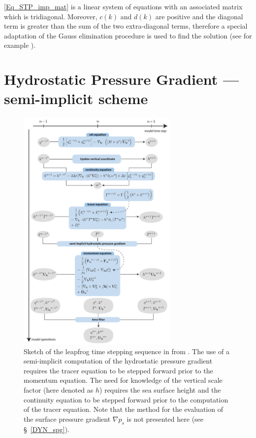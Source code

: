\eqref{Eq_STP_imp_mat} is a linear system of equations with an associated 
matrix which is tridiagonal. Moreover, $c(k)$ and $d(k)$ are positive and the diagonal 
term is greater than the sum of the two extra-diagonal terms, therefore a special 
adaptation of the Gauss elimination procedure is used to find the solution 
(see for example \citet{Richtmyer1967}).



\section{Hydrostatic Pressure Gradient --- semi-implicit scheme}
\label{STP_hpg_imp}

\begin{figure}[!t] 	  \begin{center}
\includegraphics[width=0.7\textwidth]{./TexFiles/Figures/Fig_TimeStepping_flowchart.pdf}
\caption{ 	\label{Fig_TimeStep_flowchart}
Sketch of the leapfrog time stepping sequence in \NEMO from \citet{Leclair_Madec_OM09}. 
The use of a semi-implicit computation of the hydrostatic pressure gradient requires
the tracer equation to be stepped forward prior to the momentum equation. 
The need for knowledge of the vertical scale factor (here denoted as $h$)
requires the sea surface height and the continuity equation to be stepped forward
prior to the computation of the tracer equation.
Note that the method for the evaluation of the surface pressure gradient $\nabla p_s$ is not presented here 
(see \S~\ref{DYN_spg}). }
\end{center}   \end{figure}

